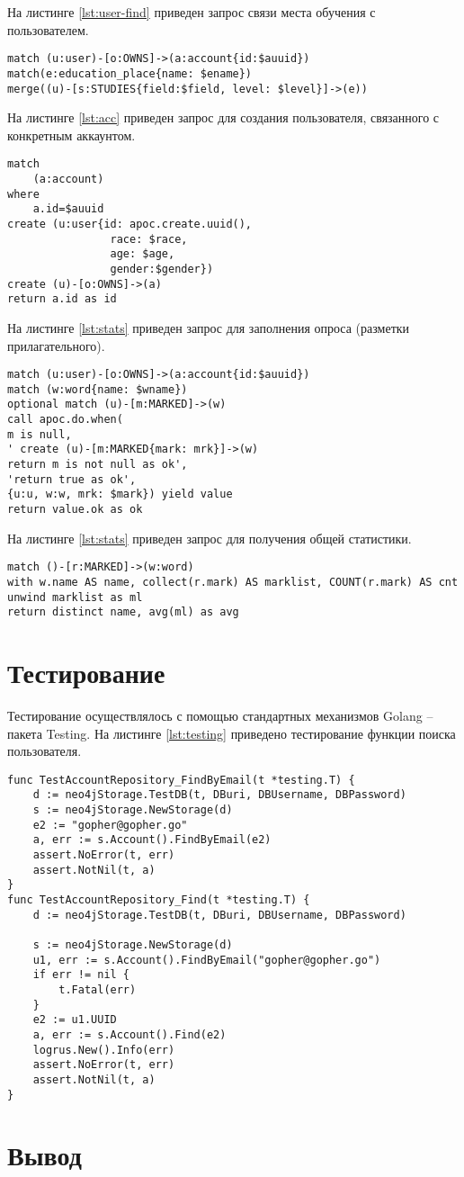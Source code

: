 На листинге \ref{lst:user-find} приведен запрос связи места обучения с пользователем.
\begin{lstlisting}[label=lst:user-find,caption=Запрос связи места обучения с пользователем]
match (u:user)-[o:OWNS]->(a:account{id:$auuid})
match(e:education_place{name: $ename})
merge((u)-[s:STUDIES{field:$field, level: $level}]->(e))
\end{lstlisting}
На листинге \ref{lst:acc} приведен запрос для создания пользователя, связанного с конкретным аккаунтом. 
\begin{lstlisting}[label=lst:acc,caption=Запрос для создания пользователя\, связанного с конкретным аккаунтом]
match
	(a:account)
where
	a.id=$auuid
create (u:user{id: apoc.create.uuid(),
				race: $race,
				age: $age,
				gender:$gender})
create (u)-[o:OWNS]->(a)
return a.id as id	
\end{lstlisting}
На листинге \ref{lst:stats} приведен запрос для заполнения опроса (разметки прилагательного).
\begin{lstlisting}[label=lst:poll,caption=Запрос для заполнения опроса]
match (u:user)-[o:OWNS]->(a:account{id:$auuid})
match (w:word{name: $wname})
optional match (u)-[m:MARKED]->(w)
call apoc.do.when(
m is null,
' create (u)-[m:MARKED{mark: mrk}]->(w)
return m is not null as ok',
'return true as ok',
{u:u, w:w, mrk: $mark}) yield value
return value.ok as ok
\end{lstlisting}
На листинге \ref{lst:stats} приведен запрос для получения общей статистики.
\begin{lstlisting}[label=lst:stats,caption=Запрос для получения общей статистики]
match ()-[r:MARKED]->(w:word)
with w.name AS name, collect(r.mark) AS marklist, COUNT(r.mark) AS cnt
unwind marklist as ml
return distinct name, avg(ml) as avg
\end{lstlisting}


\section{Тестирование}
Тестирование осуществлялось с помощью стандартных механизмов Golang -- пакета Testing\cite{testing}. На листинге \ref{lst:testing} приведено тестирование функции поиска пользователя.
\begin{lstlisting}[label=lst:testing,caption=Тестирование функции поиска пользователя]
func TestAccountRepository_FindByEmail(t *testing.T) {
	d := neo4jStorage.TestDB(t, DBuri, DBUsername, DBPassword)
	s := neo4jStorage.NewStorage(d)
	e2 := "gopher@gopher.go"
	a, err := s.Account().FindByEmail(e2)
	assert.NoError(t, err)
	assert.NotNil(t, a)
}
func TestAccountRepository_Find(t *testing.T) {
	d := neo4jStorage.TestDB(t, DBuri, DBUsername, DBPassword)
	
	s := neo4jStorage.NewStorage(d)
	u1, err := s.Account().FindByEmail("gopher@gopher.go")
	if err != nil {
		t.Fatal(err)
	}
	e2 := u1.UUID
	a, err := s.Account().Find(e2)
	logrus.New().Info(err)
	assert.NoError(t, err)
	assert.NotNil(t, a)
}
\end{lstlisting}

\section{Вывод}

 